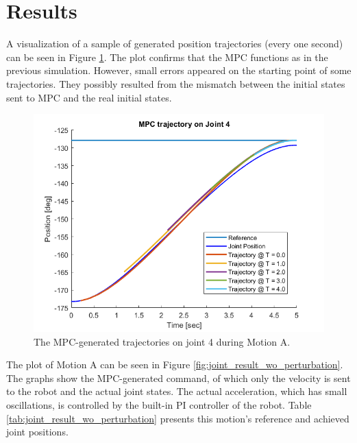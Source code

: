\documentclass[final]{LTHtwocol} %
\begin{document}
\section{Results} \label{sec:Results}
A visualization of a sample of generated position trajectories (every one second) can be seen in Figure \ref{fig:trajectory_result}. The plot confirms that the MPC functions as in the previous simulation. However, small errors appeared on the starting point of some trajectories. They possibly resulted from the mismatch between the initial states sent to MPC and the real initial states.

\begin{figure}
    \centering
    \includegraphics[width=\linewidth]{MPC_trajectory_J4.png}
    \caption{The MPC-generated trajectories on joint 4 during Motion A.}
    \label{fig:trajectory_result}
\end{figure}

The plot of Motion A can be seen in Figure \ref{fig:joint_result_wo_perturbation}. The graphs show the MPC-generated command, of which only the velocity is sent to the robot and the actual joint states. The actual acceleration, which has small oscillations, is controlled by the built-in PI controller of the robot. Table \ref{tab:joint_result_wo_perturbation} presents this motion's reference and achieved joint positions.
\end{document}
